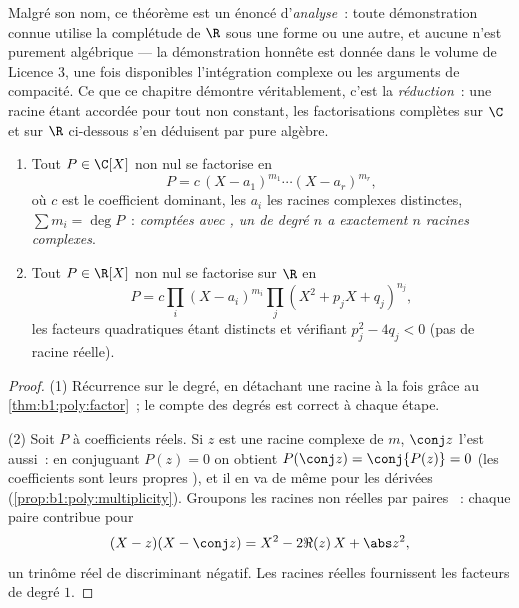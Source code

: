 \begin{remark}
Malgré son nom, ce théorème est un énoncé d'\emph{analyse}~: toute
démonstration connue utilise la complétude de $\R$ sous une forme
ou une autre, et aucune n'est purement algébrique --- la
démonstration honnête est donnée dans le volume de Licence 3, une
fois disponibles l'intégration complexe ou les arguments de
compacité. Ce que ce chapitre démontre véritablement, c'est la
\emph{réduction}~: une racine étant accordée pour tout  non
constant, les factorisations complètes sur $\C$ et sur $\R$
ci-dessous s'en déduisent par pure algèbre.
\end{remark}

\begin{corollary}\label{cor:b1:poly:factorization}
\begin{enumerate}
  \item Tout $P \in \C[X]$ non nul se factorise en
        \[
        P = c\, (X - a_1)^{m_1} \cdots (X - a_r)^{m_r},
        \]
        où $c$ est le coefficient dominant, les $a_i$ les racines
        complexes distinctes, $\sum m_i = \deg P$~: \emph{comptées
        avec , un  de degré $n$ a exactement $n$
        racines complexes}.
  \item Tout $P \in \R[X]$ non nul se factorise sur $\R$ en
        \[
        P = c \prod_i (X - a_i)^{m_i} \prod_j (X^2 + p_j X +
        q_j)^{n_j},
        \]
        les facteurs quadratiques étant distincts et vérifiant $p_j^2
        - 4q_j < 0$ (pas de racine réelle).
\end{enumerate}
\end{corollary}

\begin{proof}
(1) Récurrence sur le degré, en détachant une racine à la fois grâce au
\cref{thm:b1:poly:factor}~; le compte des degrés est correct à chaque
étape.

(2) Soit $P$ à coefficients réels. Si $z$ est une racine complexe de
 $m$, $\conj z$ l'est aussi~: en conjuguant $P(z) = 0$ on
obtient $P(\conj z) = \conj{P(z)} = 0$ (les coefficients sont leurs
propres ), et il en va de même pour les dérivées
(\cref{prop:b1:poly:multiplicity}). Groupons les racines non réelles
par paires ~: chaque paire contribue pour
\[
(X - z)(X - \conj z) = X^2 - 2\Re(z)\, X + \abs z^2 ,
\]
un trinôme réel de discriminant négatif. Les racines réelles
fournissent les facteurs de degré $1$.
\end{proof}

